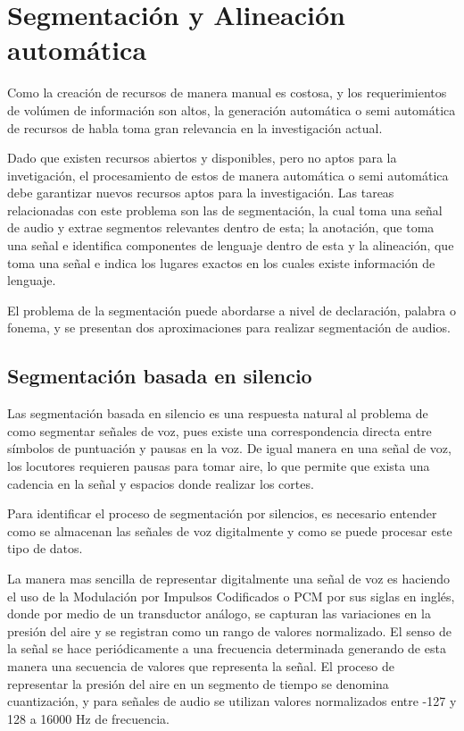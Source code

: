\documentclass[a4paper,12pt,twoside]{report}
\begin{document}
\chapter{Segmentación y Alineación automática}

Como la creación de recursos de manera manual es costosa, y los requerimientos de volúmen de información son altos, la generación automática o semi automática de recursos de habla toma gran relevancia en la investigación actual.

Dado que existen recursos abiertos y disponibles, pero no aptos para la invetigación, el procesamiento de estos de manera automática o semi automática debe garantizar nuevos recursos aptos para la investigación. Las tareas relacionadas con este problema son las de segmentación, la cual toma una señal de audio y extrae segmentos relevantes dentro de esta; la anotación, que toma una señal e identifica componentes de lenguaje dentro de esta y la alineación, que toma una señal e indica los lugares exactos en los cuales existe información de lenguaje.

El problema de la segmentación puede abordarse a nivel de declaración, palabra o fonema, y se presentan dos aproximaciones para realizar segmentación de audios.

\section{Segmentación basada en silencio}

Las segmentación basada en silencio es una respuesta natural al problema de como segmentar señales de voz, pues existe una correspondencia directa entre símbolos de puntuación y pausas en la voz. De igual manera en una señal de voz, los locutores requieren pausas para tomar aire, lo que permite que exista una cadencia en la señal y espacios donde realizar los cortes.

Para identificar el proceso de segmentación por silencios, es necesario entender como se almacenan las señales de voz digitalmente y como se puede procesar este tipo de datos.

La manera mas sencilla de representar digitalmente una señal de voz es haciendo el uso de la Modulación por Impulsos Codificados o PCM por sus siglas en inglés, donde por medio de un transductor análogo, se capturan las variaciones en la presión del aire y se registran como un rango de valores normalizado. El senso de la señal se hace periódicamente a una frecuencia determinada generando de esta manera una secuencia de valores que representa la señal. El proceso de representar la presión del aire en un segmento de tiempo se denomina cuantización, y para señales de audio se utilizan valores normalizados entre -127 y 128 a 16000 Hz de frecuencia.
\end{document}
